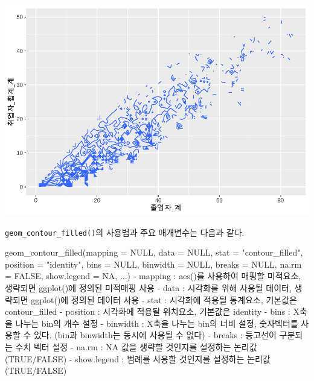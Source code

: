 \documentclass[
]{article}
\newenvironment{Shaded}{\begin{snugshade}}{\end{snugshade}}
\newcommand{\AttributeTok}[1]{\textcolor[rgb]{0.77,0.63,0.00}{#1}}
\newcommand{\ConstantTok}[1]{\textcolor[rgb]{0.00,0.00,0.00}{#1}}
\newcommand{\FunctionTok}[1]{\textcolor[rgb]{0.00,0.00,0.00}{#1}}
\newcommand{\NormalTok}[1]{#1}
\newcommand{\SpecialCharTok}[1]{\textcolor[rgb]{0.00,0.00,0.00}{#1}}
\newcommand{\StringTok}[1]{\textcolor[rgb]{0.31,0.60,0.02}{#1}}
\begin{document}
\includegraphics{chap3_files/figure-latex/unnamed-chunk-44-1.pdf}

\texttt{geom\_contour\_filled()}의 사용법과 주요 매개변수는 다음과 같다.

\begin{Shaded}
\begin{Highlighting}[]
\FunctionTok{geom\_contour\_filled}\NormalTok{(}\AttributeTok{mapping =} \ConstantTok{NULL}\NormalTok{, }\AttributeTok{data =} \ConstantTok{NULL}\NormalTok{, }\AttributeTok{stat =} \StringTok{"contour\_filled"}\NormalTok{, }\AttributeTok{position =} \StringTok{"identity"}\NormalTok{, }\AttributeTok{bins =} \ConstantTok{NULL}\NormalTok{, }\AttributeTok{binwidth =} \ConstantTok{NULL}\NormalTok{, }\AttributeTok{breaks =} \ConstantTok{NULL}\NormalTok{, }\AttributeTok{na.rm =} \ConstantTok{FALSE}\NormalTok{, }\AttributeTok{show.legend =} \ConstantTok{NA}\NormalTok{, ...)}
  \SpecialCharTok{{-}}\NormalTok{ mapping }\SpecialCharTok{:} \FunctionTok{aes}\NormalTok{()를 사용하여 매핑할 미적요소, 생략되면 }\FunctionTok{ggplot}\NormalTok{()에 정의된 미적매핑 사용}
  \SpecialCharTok{{-}}\NormalTok{ data }\SpecialCharTok{:}\NormalTok{ 시각화를 위해 사용될 데이터, 생략되면 }\FunctionTok{ggplot}\NormalTok{()에 정의된 데이터 사용}
  \SpecialCharTok{{-}}\NormalTok{ stat }\SpecialCharTok{:}\NormalTok{ 시각화에 적용될 통계요소, 기본값은 }\StringTok{\textquotesingle{}contour\_filled\textquotesingle{}}
  \SpecialCharTok{{-}}\NormalTok{ position }\SpecialCharTok{:}\NormalTok{ 시각화에 적용될 위치요소, 기본값은 }\StringTok{\textquotesingle{}identity\textquotesingle{}}
  \SpecialCharTok{{-}}\NormalTok{ bins }\SpecialCharTok{:}\NormalTok{ X축을 나누는 bin의 개수 설정}
  \SpecialCharTok{{-}}\NormalTok{ binwidth }\SpecialCharTok{:}\NormalTok{ X축을 나누는 bin의 너비 설정, 숫자벡터를 사용할 수 있다. (bin과 binwidth는 동시에 사용될 수 없다)}
  \SpecialCharTok{{-}}\NormalTok{ breaks }\SpecialCharTok{:}\NormalTok{ 등고선이 구분되는 수치 벡터 설정}
  \SpecialCharTok{{-}}\NormalTok{ na.rm }\SpecialCharTok{:} \ConstantTok{NA}\NormalTok{ 값을 생략할 것인지를 설정하는 논리값(}\ConstantTok{TRUE}\SpecialCharTok{/}\ConstantTok{FALSE}\NormalTok{)}
  \SpecialCharTok{{-}}\NormalTok{ show.legend }\SpecialCharTok{:}\NormalTok{ 범례를 사용할 것인지를 설정하는 논리값(}\ConstantTok{TRUE}\SpecialCharTok{/}\ConstantTok{FALSE}\NormalTok{) }
\end{Highlighting}
\end{Shaded}
\end{document}
